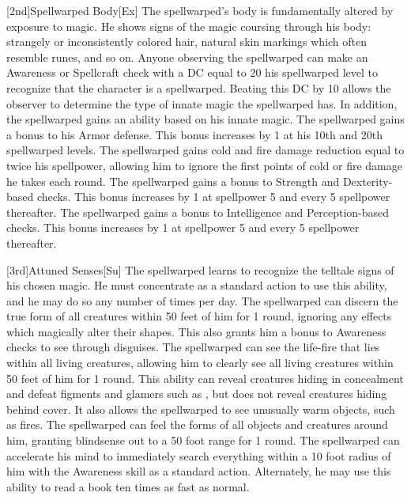 [2nd]{Spellwarped Body}[Ex]
The spellwarped's body is fundamentally altered by exposure to magic.
He shows signs of the magic coursing through his body: strangely or inconsistently colored hair, natural skin markings which often resemble runes, and so on.
Anyone observing the spellwarped can make an Awareness or Spellcraft check with a DC equal to 20 \sub his spellwarped level to recognize that the character is a spellwarped.
Beating this DC by 10 allows the observer to determine the type of innate magic the spellwarped has.
In addition, the spellwarped gains an ability based on his innate magic.
The spellwarped gains a  bonus to his Armor defense.
This bonus increases by 1 at his 10th and 20th spellwarped levels.
The spellwarped gains cold and fire damage reduction equal to twice his spellpower, allowing him to ignore the first points of cold or fire damage he takes each round.
The spellwarped gains a  bonus to Strength and Dexterity-based checks.
This bonus increases by 1 at spellpower 5 and every 5 spellpower thereafter.
The spellwarped gains a  bonus to Intelligence and Perception-based checks.
This bonus increases by 1 at spellpower 5 and every 5 spellpower thereafter.

[3rd]{Attuned Senses}[Su]
The spellwarped learns to recognize the telltale signs of his chosen magic.
He must concentrate as a standard action to use this ability, and he may do so any number of times per day.
The spellwarped can discern the true form of all creatures within 50 feet of him for 1 round, ignoring any effects which magically alter their shapes.
This also grants him a  bonus to Awareness checks to see through disguises.
The spellwarped can see the life-fire that lies within all living creatures, allowing him to clearly see all living creatures within 50 feet of him for 1 round.
This ability can reveal creatures hiding in concealment and defeat figments and glamers such as , but does not reveal creatures hiding behind cover.
It also allows the spellwarped to see unusually warm objects, such as fires.
The spellwarped can feel the forms of all objects and creatures around him, granting blindsense out to a 50 foot range for 1 round.
The spellwarped can accelerate his mind to immediately search everything within a 10 foot radius of him with the Awareness skill as a standard action.
Alternately, he may use this ability to read a book ten times as fast as normal.

